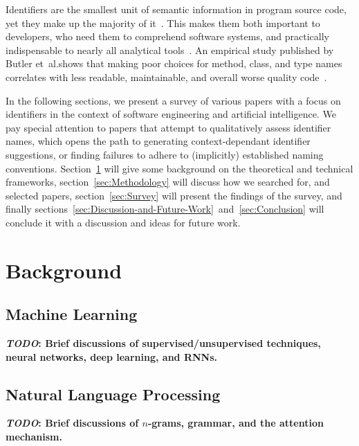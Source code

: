 \documentclass[conference]{IEEEtran}
\newcommand{\TODO}[1]{\textbf{\textcolor{Bittersweet}{#1}}\xspace}
\newcommand{\TODOM}[1]{\TODO{\emph{TODO}: #1}\xspace}
\begin{document}
Identifiers are the smallest unit of semantic information in program source code, yet they
make up the majority of it~\cite{Butler2010Empirical}. This makes them both important to
developers, who need them to comprehend software systems,  and practically indispensable
to nearly all analytical tools~\cite{Gao2019IdentGen}. An empirical study published by
Butler et~al.\@ shows that making poor choices for method, class, and type names
correlates with less readable, maintainable, and overall worse quality
code~\cite{Butler2010Empirical}.

In the following sections, we present a survey of various papers with a focus on
identifiers in the context of software engineering and artificial intelligence. We pay
special attention to papers that attempt to qualitatively assess identifier names, which
opens the path to generating context-dependant identifier suggestions, or finding failures
to adhere to (implicitly) established naming conventions. Section~\ref{sec:Background}
will give some background on the theoretical and technical frameworks,
section~\ref{sec:Methodology} will discuss how we searched for, and selected papers,
section~\ref{sec:Survey} will present the findings of the survey, and finally
sections~\ref{sec:Discussion-and-Future-Work}~and~\ref{sec:Conclusion} will conclude it
with a discussion and ideas for future work.


\section{Background}
\label{sec:Background}

\subsection{Machine Learning}
\label{ssec:Machine-Learning}

\TODOM{Brief discussions of supervised/unsupervised techniques, neural networks, deep
learning, and RNNs.}


\subsection{Natural Language Processing}
\label{ssec:Natural-Language-Processing}

\TODOM{Brief discussions of $n$-grams, grammar, and the attention mechanism.}
\end{document}
